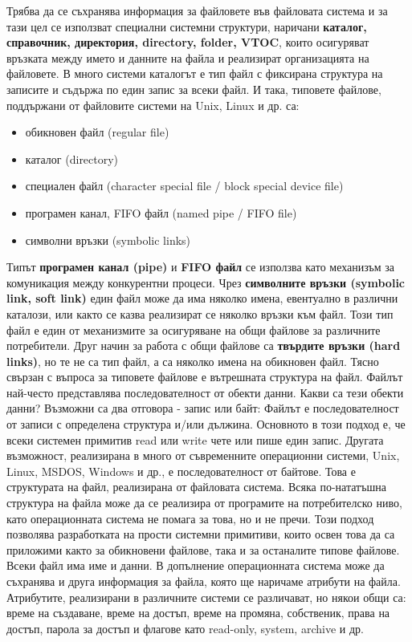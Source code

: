 \documentclass{article}
\begin{document}
Трябва да се съхранява информация за файловете във файловата система и за тази цел се използват специални
системни структури, наричани \textbf{каталог, справочник, директория, directory, folder, VTOC}, които осигуряват
връзката между името и данните на файла и реализират организацията на файловете. В много системи каталогът е
тип файл с фиксирана структура на записите и съдържа по един запис за всеки файл.
И така, типовете файлове, поддържани от файловите системи на Unix, Linux и др. са:
\begin{itemize}
    \item обикновен файл (regular file)
    \item каталог (directory)
    \item специален файл (character special file / block special device file)
    \item програмен канал, FIFO файл (named pipe / FIFO file)
    \item символни връзки (symbolic links)
\end{itemize}
Типът \textbf{програмен канал (pipe)} и \textbf{FIFO файл} се използва като механизъм за комуникация между конкурентни процеси.
Чрез \textbf{символните връзки (symbolic link, soft link)} един файл може да има няколко имена, евентуално в различни
каталози, или както се казва реализират се няколко връзки към файл. Този тип файл е един от механизмите за осигуряване на общи
файлове за различните потребители. Друг начин за работа с общи файлове са \textbf{твърдите връзки (hard links)}, но те не са тип
файл, а са няколко имена на обикновен файл. Тясно свързан с въпроса за типовете файлове е вътрешната структура на файл. Файлът
най-често представлява последователност от обекти данни. Какви са тези обекти данни? Възможни са два отговора - запис или байт:
Файлът е последователност от записи с определена структура и/или дължина. Основното в този подход е, че всеки системен примитив
read или write чете или пише един запис. Другата възможност, реализирана в много от съвременните операционни системи, Unix, Linux,
MSDOS, Windows и др., е последователност от байтове. Това е структурата на файл, реализирана от файловата система. Всяка
по-нататъшна структура на файла може да се реализира от програмите на потребителско ниво, като операционната система не помага за
това, но и не пречи. Този подход позволява разработката на прости системни примитиви, които освен това да са приложими както за
обикновени файлове, така и за останалите типове файлове. Всеки файл има име и данни. В допълнение операционната система може да
съхранява и друга информация за файла, която ще наричаме атрибути на файла. Атрибутите, реализирани в различните системи се различават,
но някои общи са: време на създаване, време на достъп, време на промяна, собственик, права на достъп, парола за достъп и флагове като
read-only, system, archive и др.
\end{document}
